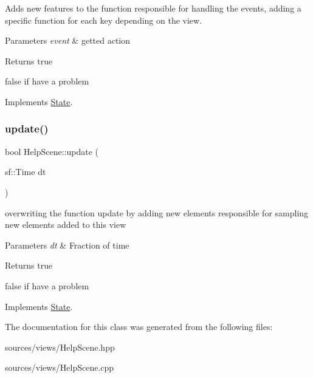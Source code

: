 Adds new features to the function responsible for handling the events, adding a specific function for each key depending on the view. 


\begin{DoxyParams}{Parameters}
{\em event} & getted action \\
\hline
\end{DoxyParams}
\begin{DoxyReturn}{Returns}
true 

false if have a problem 
\end{DoxyReturn}


Implements \hyperlink{classState_a19965f83460b248c42952aac8d001206}{State}.

\mbox{\label{classHelpScene_a2eb8b8e49f206b65291a8972f3c596c0}} 
\subsubsection{\texorpdfstring{update()}{update()}}
{\footnotesize\ttfamily bool Help\+Scene\+::update (\begin{DoxyParamCaption}\item[{sf\+::\+Time}]{dt }\end{DoxyParamCaption})\hspace{0.3cm}{\ttfamily [virtual]}}



overwriting the function update by adding new elements responsible for sampling new elements added to this view 


\begin{DoxyParams}{Parameters}
{\em dt} & Fraction of time \\
\hline
\end{DoxyParams}
\begin{DoxyReturn}{Returns}
true 

false if have a problem 
\end{DoxyReturn}


Implements \hyperlink{classState_acd5926bc7a373edff9e57f3ffe94ca13}{State}.



The documentation for this class was generated from the following files\+:\begin{DoxyCompactItemize}
\item 
sources/views/Help\+Scene.\+hpp\item 
sources/views/Help\+Scene.\+cpp\end{DoxyCompactItemize}
